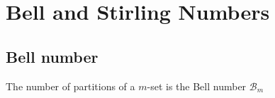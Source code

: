 \chapter{Bell and Stirling Numbers}

\section{Bell number}
The number of partitions of a $m$-set is the Bell number $\mathcal{B}_m$